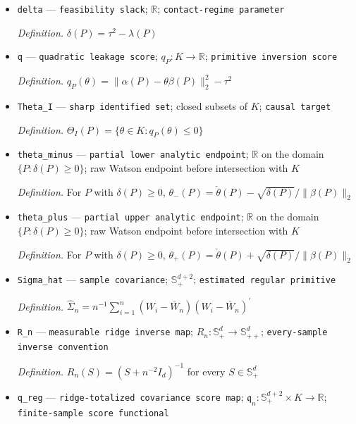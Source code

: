 \documentclass{article}
\begin{document}
\begin{itemize}
  \item \texttt{delta} --- \texttt{feasibility slack}; \(\mathbb R\); \texttt{contact-\allowbreak{}regime parameter}
  \par\smallskip\noindent\emph{Definition.} \(\delta(P)=\tau^2-\lambda(P)\)
  \item \texttt{q} --- \texttt{quadratic leakage score}; \(q_P:K\to\mathbb R\); \texttt{primitive inversion score}
  \par\smallskip\noindent\emph{Definition.} \(q_P(\theta)=\|\alpha(P)-\theta\beta(P)\|_2^2-\tau^2\)
  \item \texttt{Theta\_\allowbreak{}I} --- \texttt{sharp identified set}; closed subsets of \(K\); \texttt{causal target}
  \par\smallskip\noindent\emph{Definition.} \(\Theta_I(P)=\{\theta\in K:q_P(\theta)\leq0\}\)
  \item \texttt{theta\_\allowbreak{}minus} --- \texttt{partial lower analytic endpoint}; \(\mathbb R\) on the domain \(\{P:\delta(P)\geq0\}\); raw Watson endpoint before intersection with \(K\)
  \par\smallskip\noindent\emph{Definition.} For \(P\) with \(\delta(P)\geq0\), \(\theta_-(P)=\check\theta(P)-\sqrt{\delta(P)}/\|\beta(P)\|_2\)
  \item \texttt{theta\_\allowbreak{}plus} --- \texttt{partial upper analytic endpoint}; \(\mathbb R\) on the domain \(\{P:\delta(P)\geq0\}\); raw Watson endpoint before intersection with \(K\)
  \par\smallskip\noindent\emph{Definition.} For \(P\) with \(\delta(P)\geq0\), \(\theta_+(P)=\check\theta(P)+\sqrt{\delta(P)}/\|\beta(P)\|_2\)
  \item \texttt{Sigma\_\allowbreak{}hat} --- \texttt{sample covariance}; \(\mathbb S_+^{d+2}\); \texttt{estimated regular primitive}
  \par\smallskip\noindent\emph{Definition.} \(\widehat\Sigma_n=n^{-1}\sum_{i=1}^n(W_i-\overline W_n)(W_i-\overline W_n)^{\prime}\)
  \item \texttt{R\_\allowbreak{}n} --- \texttt{measurable ridge inverse map}; \(R_n:\mathbb S_+^d\to\mathbb S_{++}^d\); \texttt{every-\allowbreak{}sample inverse convention}
  \par\smallskip\noindent\emph{Definition.} \(R_n(S)=(S+n^{-2}I_d)^{-1}\) for every \(S\in\mathbb S_+^d\)
  \item \texttt{q\_\allowbreak{}reg} --- \texttt{ridge-\allowbreak{}totalized covariance score map}; \(\mathfrak q_n:\mathbb S_+^{d+2}\times K\to\mathbb R\); \texttt{finite-\allowbreak{}sample score functional}

\end{itemize}
\end{document}

